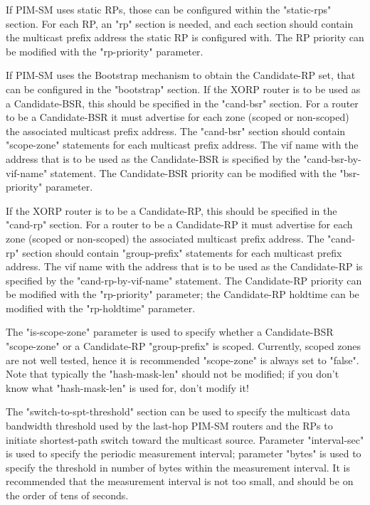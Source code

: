 \documentclass[11pt]{article}
\begin{document}
If PIM-SM uses static RPs, those can be configured within the
"static-rps" section. For each RP, an "rp" section is needed, and each
section should contain the multicast prefix address the static RP is
configured with. The RP priority can be modified with the "rp-priority"
parameter.

If PIM-SM uses the Bootstrap mechanism to obtain the Candidate-RP set,
that can be configured in the "bootstrap" section.
If the XORP router is to be used as a Candidate-BSR, this should be
specified in the "cand-bsr" section.
For a router to be a Candidate-BSR it must advertise for
each zone (scoped or non-scoped) the associated multicast prefix address.
The "cand-bsr" section should contain "scope-zone" statements for each
multicast prefix address.
The vif name with the address that is to be used as the Candidate-BSR
is specified by the "cand-bsr-by-vif-name" statement.
The Candidate-BSR priority can be modified with the "bsr-priority"
parameter.

If the XORP router is to be a Candidate-RP, this should be specified
in the "cand-rp" section.
For a router to be a Candidate-RP it must advertise for
each zone (scoped or non-scoped) the associated multicast prefix address.
The "cand-rp" section should contain "group-prefix" statements for each
multicast prefix address.
The vif name with the address that is to be used as the Candidate-RP
is specified by the "cand-rp-by-vif-name" statement.
The Candidate-RP priority can be modified with the
"rp-priority" parameter; the Candidate-RP holdtime can be modified
with the "rp-holdtime" parameter.

The "is-scope-zone" parameter is used to specify whether a Candidate-BSR
"scope-zone" or a Candidate-RP "group-prefix" is scoped. Currently,
scoped zones are not well tested, hence it is recommended "scope-zone"
is always set to "false".
Note that typically the "hash-mask-len" should not be modified; if you
don't know what "hash-mask-len" is used for, don't modify it!

The "switch-to-spt-threshold" section can be used to specify the
multicast data bandwidth threshold used by the last-hop PIM-SM routers
and the RPs to initiate shortest-path switch toward the multicast source.
Parameter "interval-sec" is used to specify the periodic measurement interval;
parameter "bytes" is used to specify the threshold in number of bytes
within the measurement interval. It is recommended that the measurement
interval is not too small, and should be on the order of tens of seconds.
\end{document}
